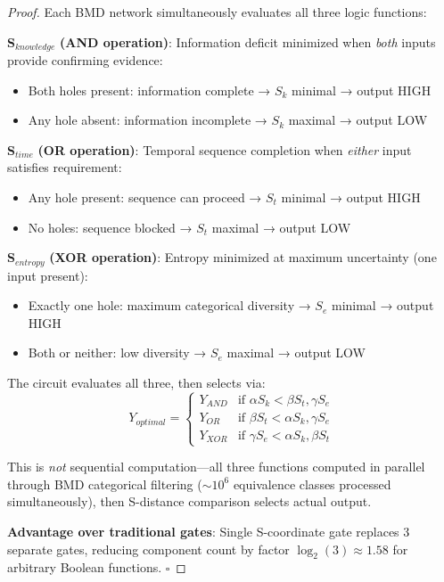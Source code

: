 \documentclass[11pt,a4paper]{article}
\begin{document}
\begin{proof}
Each BMD network simultaneously evaluates all three logic functions:

\textbf{S}$_{knowledge}$ \textbf{(AND operation)}: Information deficit minimized when \textit{both} inputs provide confirming evidence:
\begin{itemize}
\item Both holes present: information complete → $S_k$ minimal → output HIGH
\item Any hole absent: information incomplete → $S_k$ maximal → output LOW
\end{itemize}

\textbf{S}$_{time}$ \textbf{(OR operation)}: Temporal sequence completion when \textit{either} input satisfies requirement:
\begin{itemize}
\item Any hole present: sequence can proceed → $S_t$ minimal → output HIGH  
\item No holes: sequence blocked → $S_t$ maximal → output LOW
\end{itemize}

\textbf{S}$_{entropy}$ \textbf{(XOR operation)}: Entropy minimized at maximum uncertainty (one input present):
\begin{itemize}
\item Exactly one hole: maximum categorical diversity → $S_e$ minimal → output HIGH
\item Both or neither: low diversity → $S_e$ maximal → output LOW
\end{itemize}

The circuit evaluates all three, then selects via:
\begin{equation}
Y_{optimal} = \begin{cases}
Y_{AND} & \text{if } \alpha S_k < \beta S_t, \gamma S_e \\
Y_{OR} & \text{if } \beta S_t < \alpha S_k, \gamma S_e \\
Y_{XOR} & \text{if } \gamma S_e < \alpha S_k, \beta S_t
\end{cases}
\end{equation}

This is \textit{not} sequential computation—all three functions computed in parallel through BMD categorical filtering ($\sim 10^6$ equivalence classes processed simultaneously), then S-distance comparison selects actual output.

\textbf{Advantage over traditional gates}: Single S-coordinate gate replaces 3 separate gates, reducing component count by factor $\log_2(3) \approx 1.58$ for arbitrary Boolean functions. $\square$
\end{proof}
\end{document}
